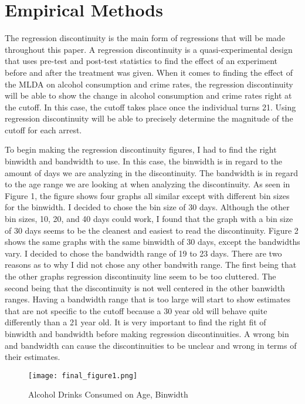 \documentclass[a4paper]{article}
\begin{document}
\section{Empirical Methods}
The regression discontinuity is the main form of regressions that will be made throughout this paper. A regression discontinuity is a quasi-experimental design that uses pre-test and post-test statistics to find the effect of an experiment before and after the treatment was given. When it comes to finding the effect of the MLDA on alcohol consumption and crime rates, the regression discontinuity will be able to show the change in alcohol consumption and crime rates right at the cutoff. In this case, the cutoff takes place once the individual turns 21. Using regression discontinuity will be able to precisely determine the magnitude of the cutoff for each arrest.
\par



To begin making the regression discontinuity figures, I had to find the right binwidth and bandwidth to use. In this case, the binwidth is in regard to the amount of days we are analyzing in the discontinuity. The bandwidth is in regard to the age range we are looking at when analyzing the discontinuity. As seen in Figure 1, the figure shows four graphs all similar except with different bin sizes for the binwidth. I decided to chose the bin size of 30 days. Although the other bin sizes, 10, 20, and 40 days could work, I found that the graph with a bin size of 30 days seems to be the cleanest and easiest to read the discontinuity. Figure 2 shows the same graphs with the same binwidth of 30 days, except the bandwidths vary. I decided to chose the bandwidth range of 19 to 23 days. There are two reasons as to why I did not chose any other bandwith range. The first being that the other graphs regression discontinuity line seem to be too cluttered. The second being that the discontinuity is not well centered in the other banwidth ranges. Having a bandwidth range that is too large will start to show estimates that are not specific to the cutoff because a 30 year old will behave quite differently than a 21 year old. It is very important to find the right fit of binwidth and bandwidth before making regression discontinuities. A wrong bin and bandwidth can cause the discontinuities to be unclear and wrong in terms of their estimates. 

\begin{figure}[h!]
    \centering
    \caption{Alcohol Drinks Consumed on Age, Binwidth}
    \texttt{[image: final\_figure1.png]}
    \label{fig:my_label}
\end{figure}
\end{document}
